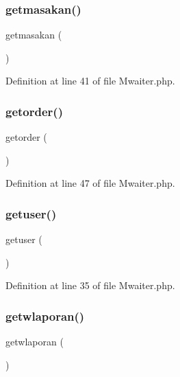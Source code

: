 \subsubsection{\texorpdfstring{getmasakan()}{getmasakan()}}
{\footnotesize\ttfamily getmasakan (\begin{DoxyParamCaption}{ }\end{DoxyParamCaption})}



Definition at line 41 of file Mwaiter.\+php.

\mbox{\label{class_mwaiter_a13da94d69caff313d692ca030da878ef}} 
\subsubsection{\texorpdfstring{getorder()}{getorder()}}
{\footnotesize\ttfamily getorder (\begin{DoxyParamCaption}{ }\end{DoxyParamCaption})}



Definition at line 47 of file Mwaiter.\+php.

\mbox{\label{class_mwaiter_acf56a129891ee0628a6367f8654f6833}} 
\subsubsection{\texorpdfstring{getuser()}{getuser()}}
{\footnotesize\ttfamily getuser (\begin{DoxyParamCaption}{ }\end{DoxyParamCaption})}



Definition at line 35 of file Mwaiter.\+php.

\mbox{\label{class_mwaiter_a82e9dda7b6ade10e8a58283ad7c3dbb8}} 
\subsubsection{\texorpdfstring{getwlaporan()}{getwlaporan()}}
{\footnotesize\ttfamily getwlaporan (\begin{DoxyParamCaption}{ }\end{DoxyParamCaption})}



